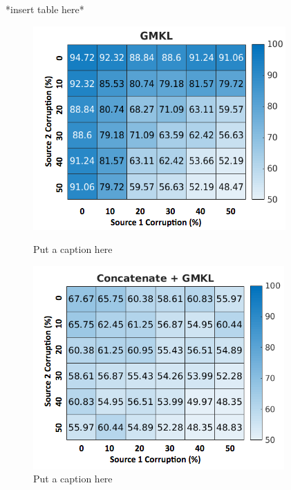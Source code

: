 \documentclass{article}
\begin{document}
*insert table here*
\begin{figure}
\begin{minipage}{.5\textwidth}
    \centering
    \includegraphics[width=\textwidth]{dxor_heat_gmkl.png}
    \caption{Put a caption here}
    \label{fig:dxor_heat_gmkl}
\end{minipage}
\begin{minipage}{.5\textwidth}
    \centering
    \includegraphics[width=\textwidth]{dxor_heat_conc.png}
    \caption{Put a caption here}
    \label{fig:dxor_heat_conc}
\end{minipage}
\end{figure}
\end{document}
